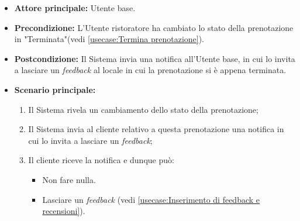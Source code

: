 \label{usecase:Notifica di richiesta di inserimento feedback}
\begin{itemize}
	\item \textbf{Attore principale:} Utente base.

	
	\item \textbf{Precondizione:} L'Utente ristoratore ha cambiato lo stato della prenotazione in "Terminata"(vedi \autoref{usecase:Termina prenotazione}).

    
	\item \textbf{Postcondizione:} Il Sistema invia una notifica all'Utente base, in cui lo invita a lasciare un \textit{feedback} al locale in cui la prenotazione si è appena terminata.
     
	\item \textbf{Scenario principale:}
	      \begin{enumerate}
                \item Il Sistema rivela un cambiamento dello stato della prenotazione;
                \item Il Sistema invia al cliente relativo a questa prenotazione una notifica in cui lo invita a lasciare un \textit{feedback};
                \item Il cliente riceve la notifica e dunque può:
                \begin{itemize}
                    \item Non fare nulla.
                    \item Lasciare un \textit{feedback} (vedi \autoref{usecase:Inserimento di feedback e recensioni}).
                \end{itemize}
	      \end{enumerate}
\end{itemize}